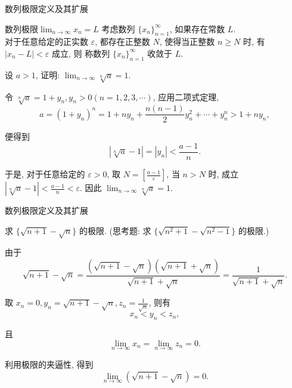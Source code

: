\documentclass[
10pt,
aspectratio=43,
]{beamer}
\begin{document}
\begin{frame}{数列极限定义及其扩展}
    \begin{block}{数列极限$\lim_{n\to\infty}x_n=L$}
        考虑数列 $\{x_n\}_{n=1}^\infty$, 如果存在{\color{green}常数 $L$}.\\
        {\color{blue}对于任意给定的正实数 $\varepsilon$}, 都存在{\color{red}正整数 $N$, 使得当正整数 $n\geq N$ 时}, {\color{blue}有 $|x_n - L| < \varepsilon$ 成立}, 则{\color{green} 称数列 $\{x_n\}_{n=1}^\infty$ 收敛于 $L$}.
    \end{block}
    {\small
    \begin{block}{}
        设 $a>1$, 证明: $\lim _{n \rightarrow \infty} \sqrt[n]{a}=1$.
    \end{block}
    \pause
    \begin{exampleblock}{}
        令 $\sqrt[n]{a}=1+y_n, y_n>0(n=1,2,3, \cdots)$, 应用二项式定理,
        $$
            a=\left(1+y_n\right)^n=1+n y_n+\frac{n(n-1)}{2} y_n^2+\cdots+y_n^n>1+n y_n,
        $$

        便得到
        $$
            |\sqrt[n]{a}-1|=\left|y_n\right|<\frac{a-1}{n} .
        $$

        于是, 对于任意给定的 $\varepsilon>0$, 取 $N=\left[\frac{a-1}{\varepsilon}\right]$, 当 $n>N$ 时, 成立
        $|\sqrt[n]{a}-1|<\frac{a-1}{n}<\varepsilon$. 因此 $\lim _{n \rightarrow \infty} \sqrt[n]{a}=1$.
    \end{exampleblock}
    }
\end{frame}

\begin{frame}{数列极限定义及其扩展}
    \begin{block}{}
        求 $\{\sqrt{n+1}-\sqrt{n}\}$ 的极限. (思考题: 求 $\{\sqrt{n^2+1}-\sqrt{n^2-1}\}$ 的极限.)
    \end{block}
    \begin{exampleblock}{}
        由于
        $$
            \sqrt{n+1}-\sqrt{n}=\frac{(\sqrt{n+1}-\sqrt{n})(\sqrt{n+1}+\sqrt{n})}{\sqrt{n+1}+\sqrt{n}}=\frac{1}{\sqrt{n+1}+\sqrt{n}} .
        $$

        取 $x_n=0, y_n=\sqrt{n+1}-\sqrt{n}, z_n=\frac{1}{\sqrt{n}}$, 则有
        $$
            x_n<y_n<z_n,
        $$

        且
        $$
            \lim _{n \rightarrow \infty} x_n=\lim _{n \rightarrow \infty} z_n=0.
        $$

        利用极限的夹逼性, 得到
        $$
            \lim _{n \rightarrow \infty}(\sqrt{n+1}-\sqrt{n})=0 .
        $$
    \end{exampleblock}
\end{frame}
\end{document}
